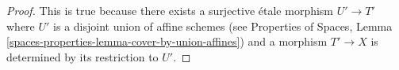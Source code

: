 \documentclass[10pt,a4paper]{amsart}
\theoremstyle{plain}
\theoremstyle{definition}
\theoremstyle{remark}
\numberwithin{equation}{subsection}
\begin{document}
\begin{proof}
This is true because there exists a surjective \'etale morphism
$U' \to T'$ where $U'$ is a disjoint union of affine schemes (see
Properties of Spaces, Lemma
\ref{spaces-properties-lemma-cover-by-union-affines})
and a morphism $T' \to X$ is determined by its restriction to $U'$.
\end{proof}
\end{document}
